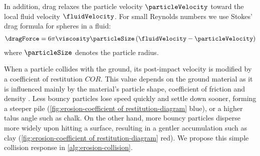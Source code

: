 In addition, drag relaxes the particle velocity $\particleVelocity$ toward the local fluid velocity $\fluidVelocity$. For small Reynolds numbers we use Stokes' drag formula for spheres in a fluid:
\begin{align}
    \label{eq:erosion-drag}
    \dragForce = 6\pi \viscosity \particleSize \left(\fluidVelocity - \particleVelocity\right)
\end{align}
where $\particleSize$ denotes the particle radius.

    
When a particle collides with the ground, its post-impact velocity is modified by a coefficient of restitution $COR$. This value depends on the ground material as it is influenced mainly by the material's particle shape, coefficient of friction and density \cite{Yan2020}. Less bouncy particles lose speed quickly and settle down sooner, forming a steeper pile (\cref{fig:erosion-coefficient of restitution-diagram} blue), or a higher talus angle such as chalk. On the other hand, more bouncy particles disperse more widely upon hitting a surface, resulting in a gentler accumulation such as clay (\cref{fig:erosion-coefficient of restitution-diagram} red). We propose this simple collision response in \cref{alg:erosion-collision}. 

